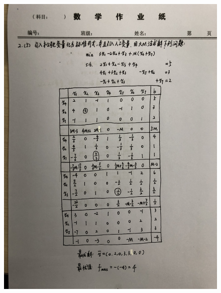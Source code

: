 \documentclass[a4paper]{article}
\begin{document}
\begin{figure}[htbp]
	\centering
	\includegraphics[height=23cm]{3.JPG}
\end{figure}
\end{document}
